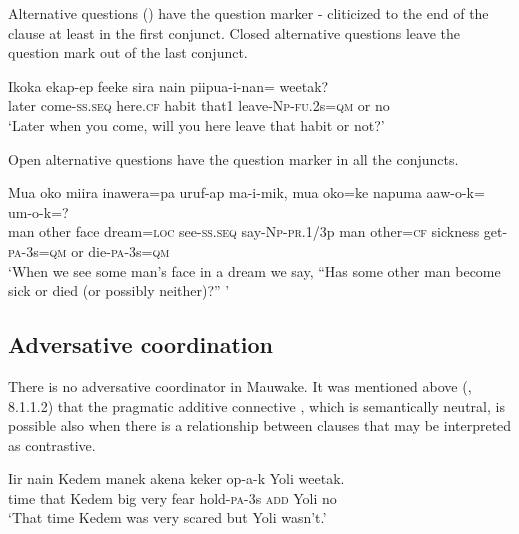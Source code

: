 Alternative questions () have the question marker - cliticized to the end of the clause at least in the first conjunct. Closed alternative questions leave the question mark out of the last conjunct. 

\ea%
\label{ex:x1386}
\gll Ikoka  ekap-ep  feeke  sira  nain  piipua-i-nan=   weetak?\\
later  come-\textsc{ss}.\textsc{seq}  here.\textsc{cf}  habit  that1  leave-\textsc{Np}-\textsc{fu}.2s=\textsc{qm} or  no\\
\glt`Later when you come, will you here leave that habit or not?'
\z


Open alternative questions have the question marker in all the conjuncts.

\ea%
\label{ex:x1384}
\gll Mua  oko  miira  inawera=pa  uruf-ap  ma-i-mik, mua  oko=ke  napuma  aaw-o-k=    um-o-k=?\\
man  other  face  dream=\textsc{loc}  see-\textsc{ss}.\textsc{seq}  say-\textsc{Np}-\textsc{pr}.1/3p man  other=\textsc{cf} sickness  get-\textsc{pa}-3s=\textsc{qm}  or  die-\textsc{pa}-3s=\textsc{qm}\\
\glt`When we see some man's face in a dream we say, ``Has some other man become sick or died (or possibly neither)?'' '
\z


\subsection{Adversative coordination}

There is no adversative coordinator in Mauwake. It was mentioned above  (, 8.1.1.2) that the pragmatic additive connective , which is semantically neutral, is possible also when there is a relationship between clauses that may be interpreted as contrastive. 

\ea%
\label{ex:x1388}
\gll Iir  nain  Kedem  manek  akena  keker  op-a-k   Yoli  weetak.\\
time  that  Kedem  big  very  fear  hold-\textsc{pa}-3s \textsc{add}  Yoli  no \\
\glt`That time Kedem was very scared but Yoli wasn't.'
\z



